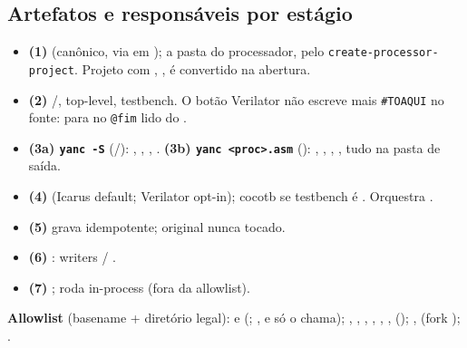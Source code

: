 \subsection{Artefatos e responsáveis por estágio}

\begin{itemize}[leftmargin=1.4em]
  \item \textbf{(1)}  (canônico, via  em
        ); a pasta do processador, pelo
        \lstinline|create-processor-project|. Projeto com ,
        ,  é convertido na abertura.
  \item \textbf{(2)} /, top-level, testbench. O
        botão Verilator não escreve mais \lstinline|#TOAQUI| no fonte: para no
        \lstinline|@fim| lido do .
  \item \textbf{(3a) \texttt{yanc -S}} (/):
        , , ,
        . \textbf{(3b) \texttt{yanc <proc>.asm}}
        (): , , ,
        , tudo na pasta de saída.
  \item \textbf{(4)}  (Icarus default; Verilator opt-in);
        cocotb se testbench é . Orquestra .
  \item \textbf{(5)}  grava 
        idempotente; original nunca tocado.
  \item \textbf{(6)} : writers  /
        .
  \item \textbf{(7)} ;  roda in-process (fora da
        allowlist).
\end{itemize}

\textbf{Allowlist} (basename + diretório legal):  e
 (; ,
 e  só o  chama); , ,
, , , ,
 (); ,
 (fork ); .
